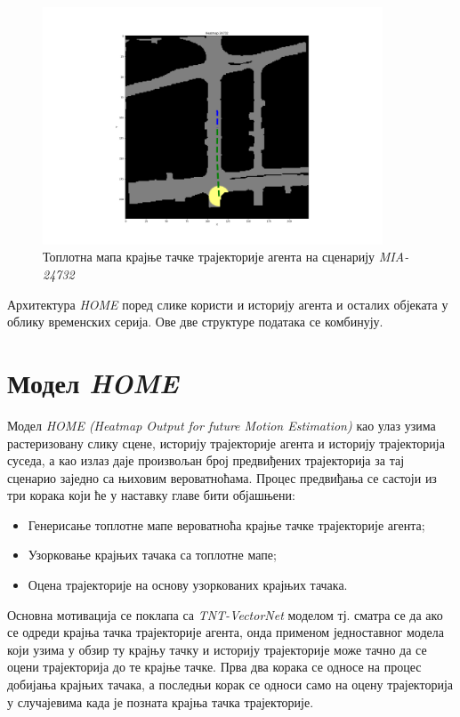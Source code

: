 \documentclass[11pt,oneside]{memoir}
\begin{document}
\begin{figure}[H]
  \centering
  \includegraphics[width=0.9\textwidth]{images/heatmap_MIA_24732.png}
  \caption{Топлотна мапа крајње тачке трајекторије агента на сценарију \textit{MIA-24732} \label{heatmap-MIA-24732}}
\end{figure}

Архитектура \textit{HOME} поред слике користи и историју агента и осталих објеката у облику временских серија. Ове две структуре података
се комбинују.

\section{Модел \textit{HOME}}

Модел \textit{HOME (Heatmap Output for future Motion Estimation)} \cite{home} као улаз узима растеризовану слику сцене, историју трајекторије агента
и историју трајекторија суседа, 
а као излаз даје произвољан број предвиђених трајекторија за тај сценарио заједно са њиховим вероватноћама. 
Процес предвиђања се састоји из три корака који ће у наставку главе бити објашњени:
\begin{itemize}
  \item Генерисање топлотне мапе вероватноћа крајње тачке трајекторије агента;
  \item Узорковање крајњих тачака са топлотне мапе;
  \item Оцена трајекторије на основу узоркованих крајњих тачака.
\end{itemize}

Основна мотивација се поклапа са \textit{TNT-VectorNet} моделом тј. сматра се да ако се одреди крајња тачка трајекторије агента, онда применом једноставног
модела који узима у обзир ту крајњу тачку и историју трајекторије може тачно да се оцени трајекторија до те крајње тачке. Прва два корака се односе
на процес добијања крајњих тачака, а последњи корак се односи само на оцену трајекторија у случајевима када је позната крајња тачка трајекторије.
\end{document}
